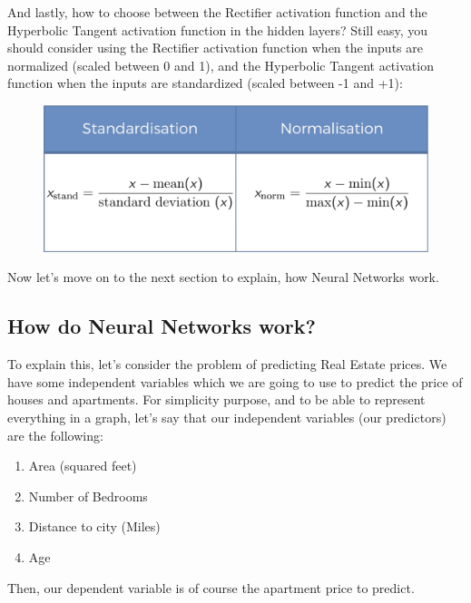 \documentclass[]{book}
\begin{document}
And lastly, how to choose between the Rectifier activation function and the Hyperbolic Tangent activation function in the hidden layers? Still easy, you should consider using the Rectifier activation function when the inputs are normalized (scaled between 0 and 1), and the Hyperbolic Tangent activation function when the inputs are standardized (scaled between -1 and +1):

\begin{figure}[!htbp]
        \begin{center}
            \includegraphics[scale=0.18]{ANN_16.png}
        \end{center}
\end{figure}

Now let's move on to the next section to explain, how Neural Networks work.

\newpage

\subsection{How do Neural Networks work?}

To explain this, let's consider the problem of predicting Real Estate prices. We have some independent variables which we are going to use to predict the price of houses and apartments. For simplicity purpose, and to be able to represent everything in a graph, let's say that our independent variables (our predictors) are the following:

\begin{enumerate}
    \item Area (squared feet)
    \item Number of Bedrooms
    \item Distance to city (Miles)
    \item Age
\end{enumerate}

Then, our dependent variable is of course the apartment price to predict.
\end{document}
